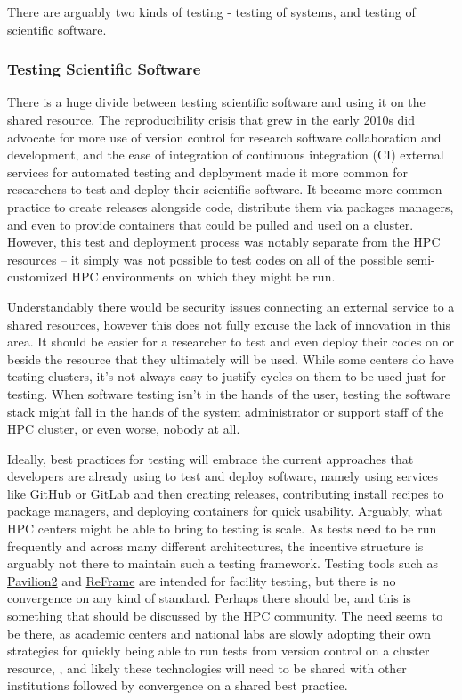 There are arguably two kinds of testing - testing of systems, and testing of scientific software.

\subsubsection{Testing Scientific Software}

There is a huge divide between testing scientific software and using it on the shared resource. The reproducibility crisis that grew in the early 2010s \cite{replication-crisis} did advocate for more use of version control \cite{github,gitlab} for research software collaboration and development, and the ease of integration of continuous integration (CI) external services for automated testing and deployment \cite{travis,circle,jenkins} made it more common for researchers to test and deploy their scientific software. It became more common practice to create releases alongside code, distribute them via packages managers, and even to provide containers that could be pulled and used on a cluster. However, this test and deployment process was notably separate from the HPC resources -- it simply was not possible to test codes on all of the possible semi-customized HPC environments on which they might be run. 

Understandably there would be security issues connecting an external service to a shared resources, however this does not fully excuse the lack of innovation in this area. It should be easier for a researcher to test and even deploy their codes on or beside the resource that they ultimately will be used. While some centers do have testing clusters, it's not always easy to justify cycles on them to be used just for testing. When software testing isn't in the hands of the user, testing the software stack might fall in the hands of the system administrator or support staff of the HPC cluster, or even worse, nobody at all.

Ideally, best practices for testing will embrace the current approaches that developers are already using to test and deploy software, namely using services like GitHub or GitLab and then creating releases, contributing install recipes to package managers, and deploying containers for quick usability. Arguably, what HPC centers might be able to bring to testing is scale. As tests need to be run frequently and across many different architectures, the incentive structure is arguably not there to maintain such a testing framework. Testing tools such as \href{https://github.com/hpc/pavilion2}{Pavilion2} and \href{https://github.com/eth-cscs/reframe}{ReFrame} are intended for facility testing, but there is no convergence on any kind of standard. Perhaps there should be, and this is something that should be discussed by the HPC community. The need seems to be there, as academic centers and national labs are slowly adopting their own strategies for quickly being able to run tests from version control on a cluster resource, \cite{}, and likely these technologies will need to be shared with other institutions followed by convergence on a shared best practice.

